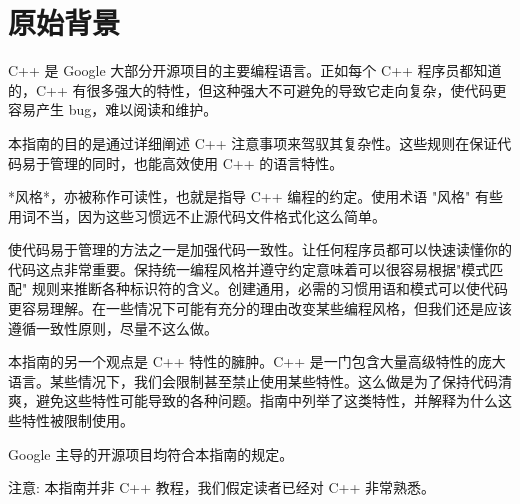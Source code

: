 \section{原始背景}

C++ 是 Google 大部分开源项目的主要编程语言。正如每个 C++ 程序员都知道的，C++ 有很多强大的特性，但这种强大不可避免的导致它走向复杂，使代码更容易产生 bug，难以阅读和维护。

本指南的目的是通过详细阐述 C++ 注意事项来驾驭其复杂性。这些规则在保证代码易于管理的同时，也能高效使用 C++ 的语言特性。

*风格*，亦被称作可读性，也就是指导 C++ 编程的约定。使用术语 "风格" 有些用词不当，因为这些习惯远不止源代码文件格式化这么简单。

使代码易于管理的方法之一是加强代码一致性。让任何程序员都可以快速读懂你的代码这点非常重要。保持统一编程风格并遵守约定意味着可以很容易根据"模式匹配" 规则来推断各种标识符的含义。创建通用，必需的习惯用语和模式可以使代码更容易理解。在一些情况下可能有充分的理由改变某些编程风格，但我们还是应该遵循一致性原则，尽量不这么做。

本指南的另一个观点是 C++ 特性的臃肿。C++ 是一门包含大量高级特性的庞大语言。某些情况下，我们会限制甚至禁止使用某些特性。这么做是为了保持代码清爽，避免这些特性可能导致的各种问题。指南中列举了这类特性，并解释为什么这些特性被限制使用。

Google 主导的开源项目均符合本指南的规定。

注意: 本指南并非 C++ 教程，我们假定读者已经对 C++ 非常熟悉。